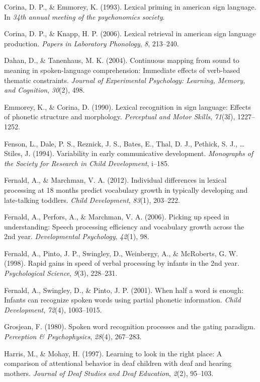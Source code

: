 \documentclass[12pt,]{article}
\begin{document}
Corina, D. P., \& Emmorey, K. (1993). Lexical priming in american sign
language. In \emph{34th annual meeting of the psychonomics society}.

Corina, D. P., \& Knapp, H. P. (2006). Lexical retrieval in american
sign language production. \emph{Papers in Laboratory Phonology},
\emph{8}, 213--240.

Dahan, D., \& Tanenhaus, M. K. (2004). Continuous mapping from sound to
meaning in spoken-language comprehension: Immediate effects of
verb-based thematic constraints. \emph{Journal of Experimental
Psychology: Learning, Memory, and Cognition}, \emph{30}(2), 498.

Emmorey, K., \& Corina, D. (1990). Lexical recognition in sign language:
Effects of phonetic structure and morphology. \emph{Perceptual and Motor
Skills}, \emph{71}(3f), 1227--1252.

Fenson, L., Dale, P. S., Reznick, J. S., Bates, E., Thal, D. J.,
Pethick, S. J., \ldots{} Stiles, J. (1994). Variability in early
communicative development. \emph{Monographs of the Society for Research
in Child Development}, i--185.

Fernald, A., \& Marchman, V. A. (2012). Individual differences in
lexical processing at 18 months predict vocabulary growth in typically
developing and late-talking toddlers. \emph{Child Development},
\emph{83}(1), 203--222.

Fernald, A., Perfors, A., \& Marchman, V. A. (2006). Picking up speed in
understanding: Speech processing efficiency and vocabulary growth across
the 2nd year. \emph{Developmental Psychology}, \emph{42}(1), 98.

Fernald, A., Pinto, J. P., Swingley, D., Weinbergy, A., \& McRoberts, G.
W. (1998). Rapid gains in speed of verbal processing by infants in the
2nd year. \emph{Psychological Science}, \emph{9}(3), 228--231.

Fernald, A., Swingley, D., \& Pinto, J. P. (2001). When half a word is
enough: Infants can recognize spoken words using partial phonetic
information. \emph{Child Development}, \emph{72}(4), 1003--1015.

Grosjean, F. (1980). Spoken word recognition processes and the gating
paradigm. \emph{Perception \& Psychophysics}, \emph{28}(4), 267--283.

Harris, M., \& Mohay, H. (1997). Learning to look in the right place: A
comparison of attentional behavior in deaf children with deaf and
hearing mothers. \emph{Journal of Deaf Studies and Deaf Education},
\emph{2}(2), 95--103.
\end{document}
